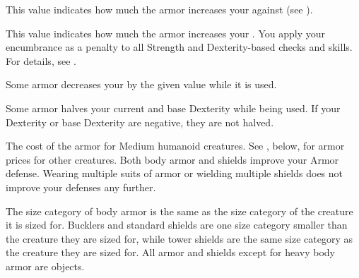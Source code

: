          This value indicates how much the armor increases your  against  (see ).

         This value indicates how much the armor increases your .
        You apply your encumbrance as a penalty to all Strength and Dexterity-based checks and skills.
        For details, see .

         Some armor decreases your  by the given value while it is used.

         Some armor halves your current and base Dexterity while being used.
        If your Dexterity or base Dexterity are negative, they are not halved.

         The cost of the armor for Medium humanoid creatures.
        See , below, for armor prices for other creatures.
         Both body armor and shields improve your Armor defense.
        Wearing multiple suits of armor or wielding multiple shields does not improve your defenses any further.

         The size category of body armor is the same as the size category of the creature it is sized for.
        Bucklers and standard shields are one size category smaller than the creature they are sized for, while tower shields are the same size category as the creature they are sized for.
        All armor and shields except for heavy body armor are  objects.

